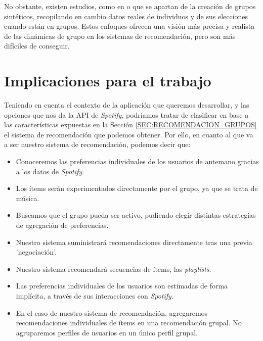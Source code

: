 No obstante, existen estudios, como en \cite{Senot2010Analysis} o \cite{Tran2019Interact} que se apartan de la creación de grupos sintéticos, recopilando en cambio datos reales de individuos y de sus elecciones cuando 
están en grupos. Estos enfoques ofrecen una visión más precisa y realista de las dinámicas de grupo en los sistemas de recomendación, pero son más difíciles de
conseguir.


\section{Implicaciones para el trabajo\label{SEC:DISCUSION_RECOMENDACION}}

Teniendo en cuenta el contexto de la aplicación que queremos desarrollar, y las opciones que nos da la API de \textit{Spotify}, podríamos tratar 
de clasificar en base a las características expuestas en la Sección \ref{SEC:RECOMENDACION_GRUPOS} el sistema de recomendación que podemos obtener. 
Por ello, en cuanto al que va a ser nuestro sistema de recomendación, podemos decir que:
\begin{itemize}
    \item Conoceremos las preferencias individuales de los usuarios de antemano gracias a los datos de \textit{Spotify}.
    \item Los ítems serán experimentados directamente por el grupo, ya que se trata de música.
    \item Buscamos que el grupo pueda ser activo, pudiendo elegir distintas estrategias de agregación de preferencias.
    \item Nuestro sistema suministrará recomendaciones directamente tras una previa 'negociación'.
    \item Nuestro sistema recomendará secuencias de ítems, las \textit{playlists}.
    \item Las preferencias individuales de los usuarios son estimadas de forma implícita, a través de sus interacciones con \textit{Spotify}.
    \item En el caso de nuestro sistema de recomendación, agregaremos recomendaciones individuales de ítems en una recomendación grupal. No agruparemos
    perfiles de usuarios en un único perfil grupal.
\end{itemize}

